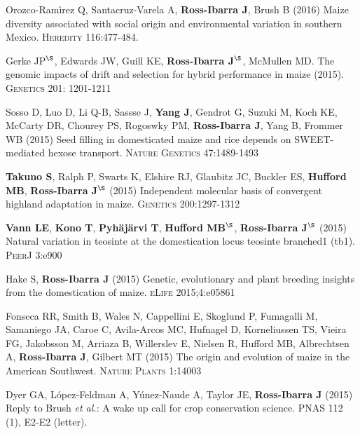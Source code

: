 \documentclass[letterpaper,10pt]{article}
\begin{document}
\begin{etaremune}
\item Orozco-Ram\`{i}rez Q, Santacruz-Varela A, {\bf Ross-Ibarra J}, Brush B (2016) Maize diversity associated with social origin and environmental variation in southern Mexico. \textsc{Heredity} 116:477-484.


\item Gerke JP$^\S$, Edwards JW, Guill KE, {\bf Ross-Ibarra J}$^\S$, McMullen MD.  The genomic impacts of drift and selection for hybrid performance in maize (2015). \textsc{Genetics}  201: 1201-1211


\item Sosso D, Luo D, Li Q-B, Sassse J, {\bf Yang J}, Gendrot G, Suzuki M, Koch KE, McCarty DR, Chourey PS, Rogoswky PM, {\bf Ross-Ibarra J}, Yang B, Frommer WB (2015) Seed filling in domesticated maize and rice depends on SWEET-mediated hexose transport. \textsc{Nature Genetics} 47:1489-1493


\item {\bf Takuno S}, Ralph P, Swarts K, Elshire RJ, Glaubitz JC, Buckler ES, {\bf Hufford MB}, {\bf Ross-Ibarra J}$^\S$ (2015) Independent molecular basis of convergent highland adaptation in maize. \textsc{Genetics} 200:1297-1312


\item {\bf Vann LE}, {\bf Kono T}, {\bf Pyh\"aj\"arvi T}, {\bf Hufford MB}$^\S$, {\bf Ross-Ibarra J}$^\S$ (2015) Natural variation in teosinte at the domestication locus teosinte branched1 (tb1). \textsc{PeerJ} 3:e900


\item Hake S, {\bf Ross-Ibarra J} (2015) Genetic, evolutionary and plant breeding insights from the domestication of maize. \textsc{eLife}  2015;4:e05861


\item Fonseca RR, Smith B, Wales N, Cappellini E, Skoglund P, Fumagalli M, Samaniego JA, Caroe C, Avila-Arcos MC, Hufnagel D, Korneliussen TS, Vieira FG, Jakobsson M, Arriaza B, Willerslev E, Nielsen R, Hufford MB, Albrechtsen A,  {\bf Ross-Ibarra J}, Gilbert MT (2015) The origin and evolution of maize in the American Southwest. \textsc{Nature Plants} 1:14003

\item Dyer GA, L\'opez-Feldman A, Y\'unez-Naude A, Taylor JE, {\bf Ross-Ibarra J} (2015) Reply to Brush \emph{et al.}: A wake up call for crop conservation science. PNAS 112 (1), E2-E2 (letter).



\end{etaremune}
\end{document}
